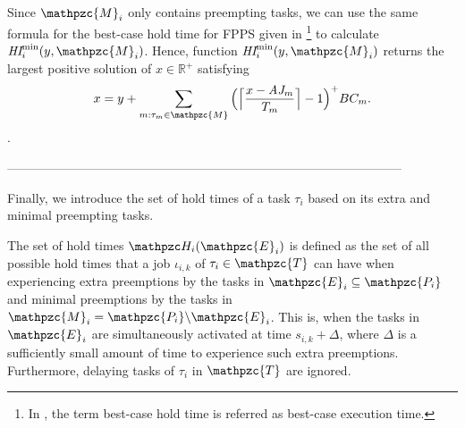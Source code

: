 Since $\mathpzc{M}_i$ only contains preempting tasks, we can use the same formula for the best-case hold time for FPPS given in \cite{BFV08}\footnote{In \cite{BFV08}, the term best-case hold time is referred as best-case execution time.} to calculate $\hi^{\rm{min}}_i(y,\mathpzc{M}_i)$. Hence, function $\hi^{\rm{min}}_i(y,\mathpzc{M}_i)$ returns the largest positive solution of $x \in \mathbb{R}^+$ satisfying
\begin{align} \label{eqn:best_case_hold_interval}
x = y + \sum\limits_{m:\tau_m \in \mathpzc{M}} \Big( \Big\lceil  \dfrac{x-\aj_m}{T_m}\Big\rceil -1 \Big)^+  BC_m.
\end{align}.

-----------------------------------------------------------------------------------------------

Finally, we introduce the set of hold times of a task $\tau_i$ based on its extra and minimal preempting tasks.

\begin{definition} \label{def:ht}
	The set of hold times $\hlt_i(\mathpzc{E}_i)$ is defined as the set of all possible hold times that a job $\iota_{i,k}$ of $\tau_i\in \mathpzc{T}$ can have when experiencing extra preemptions by the tasks in $\mathpzc{E}_i \subseteq \mathpzc{P_i}$ and minimal preemptions by the tasks in $\mathpzc{M}_i = \mathpzc{P_i} \backslash \mathpzc{E}_i$. This is, when the tasks in $\mathpzc{E}_i$ are simultaneously activated at time $s_{i,k}+\Delta$, where $\Delta$ is a sufficiently small amount of time to experience such extra preemptions.  Furthermore, delaying tasks of $\tau_i$ in $ \mathpzc{T}$ are ignored.
\end{definition}

